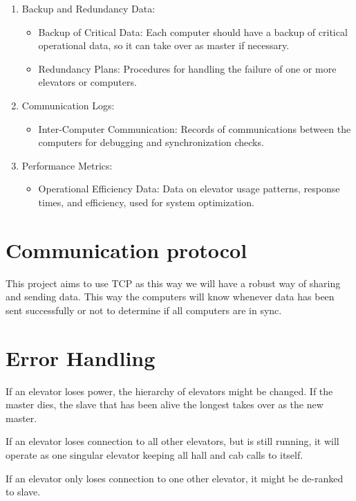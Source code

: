 \begin{enumerate}
\begin{itemize}
    \end{itemize}    
    \item Backup and Redundancy Data:
    \begin{itemize}
        \item Backup of Critical Data: Each computer should have a backup of critical operational data, so it can take over as master if necessary.
        \item Redundancy Plans: Procedures for handling the failure of one or more elevators or computers.
    \end{itemize}
    \item Communication Logs:
    \begin{itemize}
        \item Inter-Computer Communication: Records of communications between the computers for debugging and synchronization checks.
    \end{itemize}

    \item Performance Metrics:
    \begin{itemize}
        \item Operational Efficiency Data: Data on elevator usage patterns, response times, and efficiency, used for system optimization.
    \end{itemize}        
\end{enumerate}

\section{Communication protocol}
This project aims to use TCP as this way we will have a robust way of sharing and sending data. This way the computers will know whenever data has been sent successfully or not to determine if all computers are in sync. 

\section{Error Handling}
\label{sec:errorhandling}

If an elevator loses power, the hierarchy of elevators might be changed. If the master dies, the slave that has been alive the longest takes over as the new master.

If an elevator loses connection to all other elevators, but is still running, it will operate as one singular elevator keeping all hall and cab calls to itself.

If an elevator only loses connection to one other elevator, it might be de-ranked to slave. 



